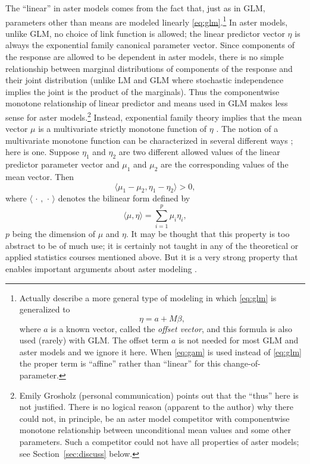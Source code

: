 \documentclass[11pt]{article}
\newcommand{\inner}[1]{\langle #1 \rangle}
\newcommand{\fatdot}{\,\cdot\,}
\begin{document}
The ``linear'' in aster models comes from the fact that, just as in GLM,
parameters other than means are modeled linearly
\eqref{eq:glm}.\footnote{Actually \citet{aster1} describe a more general type
of modeling in which \eqref{eq:glm} is generalized to \label{foot:affine}
\begin{equation} \label{eq:gam}
   \eta = a + M \beta,
\end{equation}
where $a$ is a known vector, called the \emph{offset vector},
and this formula is
also used (rarely) with GLM.  The offset term $a$ is not needed for most
GLM and aster models and we ignore it here.  When \eqref{eq:gam} is used
instead of \eqref{eq:glm} the proper term is ``affine'' rather than ``linear''
for this change-of-parameter.}
In aster
models, unlike GLM, no choice of link function is allowed;
the linear predictor vector $\eta$ is always the exponential
family canonical parameter vector.  Since components of the
response are allowed to be dependent in aster models, there is no simple
relationship between marginal distributions of components of the response
and their joint distribution (unlike LM and GLM where stochastic independence
implies the joint is the product of the marginals).  Thus the componentwise
monotone relationship of linear predictor and means used in GLM makes less sense
for aster models.\footnote{Emily Grosholz (personal communication) points out
that the ``thus'' here is not justified.  There is no logical reason
(apparent to the author) why there
could not, in principle, be an aster model competitor with componentwise
monotone relationship between unconditional mean values and some other
parameters.  Such a competitor could not have all properties of aster models;
see Section~\ref{sec:discuss} below.}
Instead, exponential family theory implies that the mean
vector $\mu$ is a multivariate strictly monotone function of $\eta$
\citep[p.~121]{barndorff-nielsen}.
The notion of a multivariate monotone function can be characterized in several
different ways \citep[Chapter~12]{rockafellar-wets}; here is one.
Suppose $\eta_1$ and $\eta_2$ are two different allowed values of the linear
predictor parameter vector and $\mu_1$ and $\mu_2$ are the corresponding
values of the mean vector.  Then
$$
   \inner{\mu_1 - \mu_2, \eta_1 - \eta_2} > 0,
$$
where $\inner{\fatdot, \fatdot}$ denotes the bilinear form defined by
\begin{equation} \label{eq:bilinear}
   \inner{\mu, \eta} = \sum_{i = 1}^p \mu_i \eta_i,
\end{equation}
$p$ being the dimension of $\mu$ and $\eta$.
It may be thought that this property is too abstract to be of much use;
it is certainly not taught in any of the theoretical or applied statistics
courses mentioned above.  But it is a very strong property that enables
important arguments about aster modeling
\citep[appendix on monotonicity; see also Section~\ref{sec:moron}
below]{aster3}.
\end{document}
